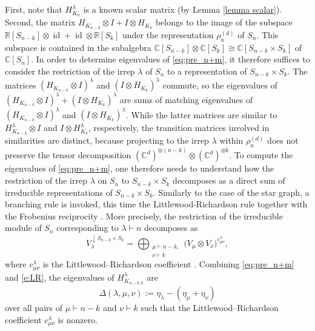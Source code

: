 \documentclass[12pt,dvipsnames,accepted=2016-08-18,a4paper,onecolumn]{quantumarticle}
\def\la{\lambda}
\DeclareMathOperator{\id}{id}
\def\la{\lambda}
\numberwithin{equation}{section}
\newcommand{\RR}{\mathbb R}
\newcommand{\CC}{\mathbb C}
\theoremstyle{definition}
\begin{document}
First, note that $H_{K_{n}}^\lambda$ is a known scalar matrix (by Lemma \ref{lemma scalar}). 
Second, the matrix $H_{K_{n-k}}\otimes I+I\otimes H_{K_k}$ belongs to the image of the subspace $\RR[S_{n-k}]\otimes \id+\id\otimes \RR[S_k]$ under the representation $\rho_n^{(d)}$ of $S_n$. 
This subspace is contained in the subalgebra $\CC[S_{n-k}]\otimes \CC[S_k]\cong \CC[S_{n-k}\times S_k]$ of $\CC[S_n]$.
In order to determine eigenvalues of \eqref{eq:pre_n+m}, it therefore suffices to consider the restriction of the irrep $\lambda$ of $S_n$ to a representation of $S_{n-k}\times S_k$.
The matrices $(H_{K_{n-k}}\otimes I)^\lambda$ and $(I\otimes H_{K_k})^\lambda$ commute, so the eigenvalues of $(H_{K_{n-k}}\otimes I)^\lambda+(I\otimes H_{K_k})^\lambda$ are sums of matching eigenvalues of $(H_{K_{n-k}}\otimes I)^\lambda$ and $(I\otimes H_{K_k})^\lambda$.
While the latter matrices are similar to $H_{K_{n-k}}^\lambda\otimes I$ and $I\otimes H_{K_k}^\lambda$, respectively, the transition matrices involved in similarities are distinct, because projecting to the irrep $\lambda$ within $\rho_n^{(d)}$ does not preserve the tensor decomposition $(\CC^d)^{\otimes (n-k)}\otimes (\CC^d)^{\otimes k}$. 
To compute the eigenvalues of \eqref{eq:pre_n+m}, one therefore needs to understand how the restriction of the irrep $\lambda$ on $S_n$ to $S_{n-k}\times S_k$ decomposes as a direct sum of irreducible representations of $S_{n-k}\times S_k$.
Similarly to the case of the star graph, a branching rule is invoked, this time the Littlewood-Richardson rule \cite[Section 4.9]{Sag01} together with the Frobenius reciprocity \cite[Theorem 1.12.6]{Sag01}. More precisely, the restriction of the irreducible module of $S_n$ corresponding to $\lambda\vdash n$ decomposes as
\begin{equation}\label{e:LR}
V_\lambda^{\downarrow S_{n-k}\times S_k}=\bigoplus_{\substack{\mu\vdash n-k,\\ \nu\vdash k}} 
\big(V_\mu \otimes V_\nu\big)^{c^\lambda_{\mu\nu}},
\end{equation}
where $c^\lambda_{\mu\nu}$ is the Littlewood–Richardson coefficient \cite[Section 4.9]{Sag01}.
Combining \eqref{eq:pre_n+m} and \eqref{e:LR}, the eigenvalues of $H_{K_{n-k,k}}^\lambda$ are
\begin{equation}\label{eq:lmn}
\Delta(\la,\mu,\nu):=\eta_\lambda-(\eta_\mu+\eta_\nu)
\end{equation}
over all pairs of $\mu\vdash n-k$ and $\nu\vdash k$ such that the Littlewood–Richardson coefficient $c^\lambda_{\mu\nu}$ is nonzero.
\end{document}
